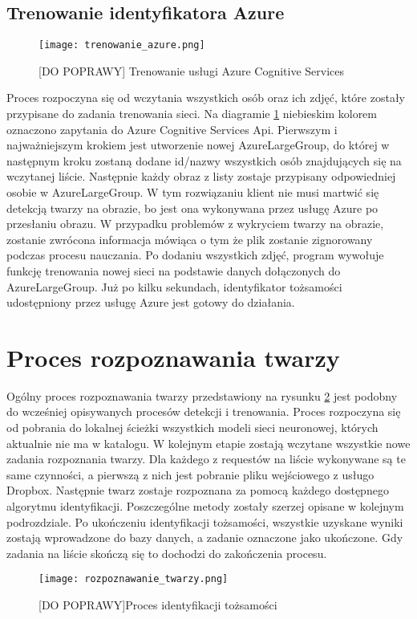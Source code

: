 \subsection{Trenowanie identyfikatora Azure} \label{trenowanie_azure}
\begin{figure}[H]
	\centering
	\texttt{[image: trenowanie\_azure.png]}
	\caption{[DO POPRAWY] Trenowanie usługi Azure Cognitive Services}
	\label{fig:trenowanie_azure}
\end{figure}
Proces rozpoczyna się od wczytania wszystkich osób oraz ich zdjęć, które zostały przypisane do zadania trenowania sieci. Na diagramie \ref{fig:trenowanie_azure} niebieskim kolorem oznaczono zapytania do Azure Cognitive Services Api. Pierwszym i najważniejszym krokiem jest utworzenie nowej AzureLargeGroup, do której w następnym kroku zostaną dodane id/nazwy wszystkich osób znajdujących się na wczytanej liście.  Następnie każdy obraz z listy zostaje przypisany odpowiedniej osobie w AzureLargeGroup. W tym rozwiązaniu klient nie musi martwić się detekcją twarzy na obrazie, bo jest ona wykonywana przez usługę Azure po przesłaniu obrazu. W przypadku problemów z wykryciem twarzy na obrazie, zostanie zwrócona informacja mówiąca o tym że plik zostanie zignorowany podczas procesu nauczania. Po dodaniu wszystkich zdjęć, program wywołuje funkcję trenowania nowej sieci na podstawie danych dołączonych do AzureLargeGroup. Już po kilku sekundach, identyfikator tożsamości udostępniony przez usługę Azure jest gotowy do działania.

\section{Proces rozpoznawania twarzy}
Ogólny proces rozpoznawania twarzy przedstawiony na rysunku \ref{fig:rozpoznawanie_proces} jest podobny do wcześniej opisywanych procesów detekcji i trenowania. Proces rozpoczyna się od pobrania do lokalnej ścieżki wszystkich modeli sieci neuronowej, których aktualnie nie ma w katalogu. W kolejnym etapie zostają wczytane wszystkie nowe zadania rozpoznania twarzy. Dla każdego z requestów na liście wykonywane są te same czynności, a pierwszą z nich jest pobranie pliku wejściowego z usługo Dropbox. Następnie twarz zostaje rozpoznana za pomocą każdego dostępnego algorytmu identyfikacji. Poszczególne metody zostały szerzej opisane w kolejnym podrozdziale. Po ukończeniu identyfikacji tożsamości, wszystkie uzyskane wyniki zostają wprowadzone do bazy danych, a zadanie oznaczone jako ukończone. Gdy zadania na liście skończą się to dochodzi do zakończenia procesu.
\begin{figure}[H]
	\centering
	\texttt{[image: rozpoznawanie\_twarzy.png]}
	\caption{[DO POPRAWY]Proces identyfikacji tożsamości}
	\label{fig:rozpoznawanie_proces}
\end{figure}

